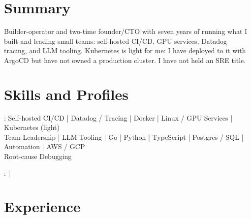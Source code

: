 \documentclass[print]{jack-resume}
\begin{document}
\pagecolor{darkmodeBackground}


\begin{minipage}[t][1cm][t]{.03\textwidth}
    \hfill
\end{minipage}

\section{Summary}
Builder-operator and two-time founder/CTO with seven years of running what I built and leading small teams: self-hosted CI/CD, GPU services, Datadog tracing, and LLM tooling. Kubernetes is light for me: I have deployed to it with ArgoCD but have not owned a production cluster. I have not held an SRE title.
\sectionsep

\section{Skills and Profiles}
:
Self-hosted CI/CD \hfill | \hfill
Datadog / Tracing \hfill | \hfill
Docker \hfill | \hfill
Linux / GPU Services \hfill | \hfill
Kubernetes (light) \\
\hspace{1.0cm} Team Leadership \hfill | \hfill
LLM Tooling \hfill | \hfill
Go \hfill | \hfill
Python \hfill | \hfill
TypeScript \hfill | \hfill
Postgres / SQL \hfill | \hfill
Automation \hfill | \hfill
AWS / GCP \\
\hspace{1.0cm} Root-cause Debugging \\

\raggedright{
    :
      \href{https://www.linkedin.com/in/jack-sturtevant/}{ \ExternalLink} |
     \href{https://github.com/jacksturt}{ \ExternalLink}}

\section{Experience}
\end{document}
